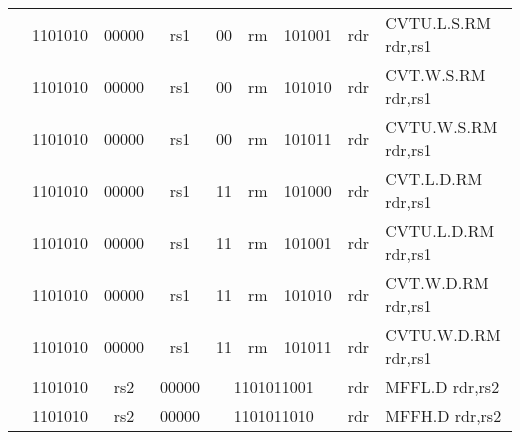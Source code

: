 \begin{table}[p]
\begin{small}
\begin{center}
\begin{tabular}{rcccccccccccl}
&
\multicolumn{2}{|c|}{1101010} &
\multicolumn{1}{c|}{00000} &
\multicolumn{1}{c|}{rs1} &
\multicolumn{1}{c|}{00} &
\multicolumn{2}{c|}{rm} &
\multicolumn{3}{c|}{101001} &
\multicolumn{1}{c|}{rdr} & CVTU.L.S.RM rdr,rs1 \\
\cline{2-12}
  

&
\multicolumn{2}{|c|}{1101010} &
\multicolumn{1}{c|}{00000} &
\multicolumn{1}{c|}{rs1} &
\multicolumn{1}{c|}{00} &
\multicolumn{2}{c|}{rm} &
\multicolumn{3}{c|}{101010} &
\multicolumn{1}{c|}{rdr} & CVT.W.S.RM rdr,rs1 \\
\cline{2-12}
  

&
\multicolumn{2}{|c|}{1101010} &
\multicolumn{1}{c|}{00000} &
\multicolumn{1}{c|}{rs1} &
\multicolumn{1}{c|}{00} &
\multicolumn{2}{c|}{rm} &
\multicolumn{3}{c|}{101011} &
\multicolumn{1}{c|}{rdr} & CVTU.W.S.RM rdr,rs1 \\
\cline{2-12}
  

&
\multicolumn{2}{|c|}{1101010} &
\multicolumn{1}{c|}{00000} &
\multicolumn{1}{c|}{rs1} &
\multicolumn{1}{c|}{11} &
\multicolumn{2}{c|}{rm} &
\multicolumn{3}{c|}{101000} &
\multicolumn{1}{c|}{rdr} & CVT.L.D.RM rdr,rs1 \\
\cline{2-12}
  

&
\multicolumn{2}{|c|}{1101010} &
\multicolumn{1}{c|}{00000} &
\multicolumn{1}{c|}{rs1} &
\multicolumn{1}{c|}{11} &
\multicolumn{2}{c|}{rm} &
\multicolumn{3}{c|}{101001} &
\multicolumn{1}{c|}{rdr} & CVTU.L.D.RM rdr,rs1 \\
\cline{2-12}
  

&
\multicolumn{2}{|c|}{1101010} &
\multicolumn{1}{c|}{00000} &
\multicolumn{1}{c|}{rs1} &
\multicolumn{1}{c|}{11} &
\multicolumn{2}{c|}{rm} &
\multicolumn{3}{c|}{101010} &
\multicolumn{1}{c|}{rdr} & CVT.W.D.RM rdr,rs1 \\
\cline{2-12}
  

&
\multicolumn{2}{|c|}{1101010} &
\multicolumn{1}{c|}{00000} &
\multicolumn{1}{c|}{rs1} &
\multicolumn{1}{c|}{11} &
\multicolumn{2}{c|}{rm} &
\multicolumn{3}{c|}{101011} &
\multicolumn{1}{c|}{rdr} & CVTU.W.D.RM rdr,rs1 \\
\cline{2-12}
  

&
\multicolumn{2}{|c|}{1101010} &
\multicolumn{1}{c|}{rs2} &
\multicolumn{1}{c|}{00000} &
\multicolumn{6}{c|}{1101011001} &
\multicolumn{1}{c|}{rdr} & MFFL.D rdr,rs2 \\
\cline{2-12}
  

&
\multicolumn{2}{|c|}{1101010} &
\multicolumn{1}{c|}{rs2} &
\multicolumn{1}{c|}{00000} &
\multicolumn{6}{c|}{1101011010} &
\multicolumn{1}{c|}{rdr} & MFFH.D rdr,rs2 \\
\cline{2-12}
  


\end{tabular}
\end{center}
\end{small}
\end{table}
